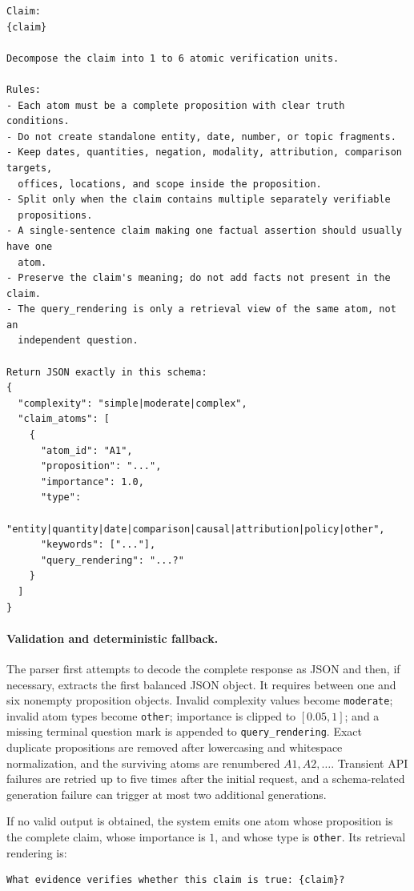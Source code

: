 \begin{lstlisting}
Claim:
{claim}

Decompose the claim into 1 to 6 atomic verification units.

Rules:
- Each atom must be a complete proposition with clear truth conditions.
- Do not create standalone entity, date, number, or topic fragments.
- Keep dates, quantities, negation, modality, attribution, comparison targets,
  offices, locations, and scope inside the proposition.
- Split only when the claim contains multiple separately verifiable
  propositions.
- A single-sentence claim making one factual assertion should usually have one
  atom.
- Preserve the claim's meaning; do not add facts not present in the claim.
- The query_rendering is only a retrieval view of the same atom, not an
  independent question.

Return JSON exactly in this schema:
{
  "complexity": "simple|moderate|complex",
  "claim_atoms": [
    {
      "atom_id": "A1",
      "proposition": "...",
      "importance": 1.0,
      "type":
        "entity|quantity|date|comparison|causal|attribution|policy|other",
      "keywords": ["..."],
      "query_rendering": "...?"
    }
  ]
}
\end{lstlisting}

\paragraph{Validation and deterministic fallback.}
The parser first attempts to decode the complete response as JSON and then,
if necessary, extracts the first balanced JSON object.  It requires between
one and six nonempty proposition objects.  Invalid complexity values become
\texttt{moderate}; invalid atom types become \texttt{other}; importance is
clipped to \([0.05,1]\); and a missing terminal question mark is appended to
\texttt{query\_rendering}.  Exact duplicate propositions are removed after
lowercasing and whitespace normalization, and the surviving atoms are
renumbered \(A1,A2,\ldots\).  Transient API failures are retried up to five
times after the initial request, and a schema-related generation failure can
trigger at most two additional generations.

If no valid output is obtained, the system emits one atom whose proposition
is the complete claim, whose importance is \(1\), and whose type is
\texttt{other}.  Its retrieval rendering is:

\begin{lstlisting}
What evidence verifies whether this claim is true: {claim}?
\end{lstlisting}

